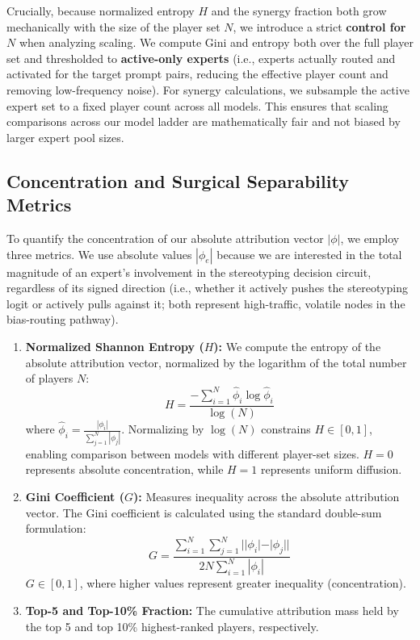 \documentclass[11pt,a4paper]{article}
\begin{document}
Crucially, because normalized entropy $H$ and the synergy fraction both grow mechanically with the size of the player set $N$, we introduce a strict \textbf{control for $N$} when analyzing scaling. We compute Gini and entropy both over the full player set and thresholded to \textbf{active-only experts} (i.e., experts actually routed and activated for the target prompt pairs, reducing the effective player count and removing low-frequency noise). For synergy calculations, we subsample the active expert set to a fixed player count across all models. This ensures that scaling comparisons across our model ladder are mathematically fair and not biased by larger expert pool sizes.

\subsection{Concentration and Surgical Separability Metrics}
To quantify the concentration of our absolute attribution vector $|\phi|$, we employ three metrics. We use absolute values $|\phi_e|$ because we are interested in the total magnitude of an expert's involvement in the stereotyping decision circuit, regardless of its signed direction (i.e., whether it actively pushes the stereotyping logit or actively pulls against it; both represent high-traffic, volatile nodes in the bias-routing pathway).
\begin{enumerate}
    \item \textbf{Normalized Shannon Entropy ($H$):} We compute the entropy of the absolute attribution vector, normalized by the logarithm of the total number of players $N$:
    $$H = \frac{-\sum_{i=1}^N \hat{\phi}_i \log \hat{\phi}_i}{\log(N)}$$
    where $\hat{\phi}_i = \frac{|\phi_i|}{\sum_{j=1}^N |\phi_j|}$. Normalizing by $\log(N)$ constrains $H \in [0, 1]$, enabling comparison between models with different player-set sizes. $H=0$ represents absolute concentration, while $H=1$ represents uniform diffusion.
    
    \item \textbf{Gini Coefficient ($G$):} Measures inequality across the absolute attribution vector. The Gini coefficient is calculated using the standard double-sum formulation:
    $$G = \frac{\sum_{i=1}^N \sum_{j=1}^N ||\phi_i| - |\phi_j||}{2 N \sum_{i=1}^N |\phi_i|}$$
    $G \in [0, 1]$, where higher values represent greater inequality (concentration).
    
    \item \textbf{Top-5 and Top-10\% Fraction:} The cumulative attribution mass held by the top 5 and top 10\% highest-ranked players, respectively.
\end{enumerate}
\end{document}
